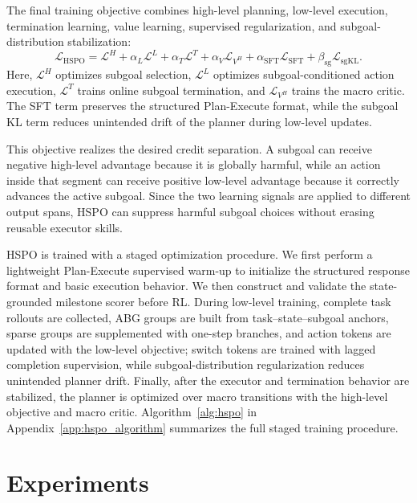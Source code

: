 \documentclass{article}
\newcommand{\wei}[1]{\textcolor{red}{#1}}
\begin{document}
The final training objective combines high-level planning, low-level execution, termination learning, value learning, supervised regularization, and subgoal-distribution stabilization:
\begin{equation}
\mathcal{L}_{\mathrm{HSPO}}
=
\mathcal{L}^{H}
+
\alpha_L \mathcal{L}^{L}
+
\alpha_T \mathcal{L}^{T}
+
\alpha_V \mathcal{L}_{V^H}
+
\alpha_{\mathrm{SFT}}\mathcal{L}_{\mathrm{SFT}}
+
\beta_{\mathrm{sg}}\mathcal{L}_{\mathrm{sgKL}}.
\label{eq:total_loss}
\end{equation}
Here, $\mathcal{L}^{H}$ optimizes subgoal selection, $\mathcal{L}^{L}$ optimizes subgoal-conditioned action execution, $\mathcal{L}^{T}$ trains online subgoal termination, and $\mathcal{L}_{V^H}$ trains the macro critic. The SFT term preserves the structured Plan-Execute format, while the subgoal KL term reduces unintended drift of the planner during low-level updates.

This objective realizes the desired credit separation. A subgoal can receive negative high-level advantage because it is globally harmful, while an action inside that segment can receive positive low-level advantage because it correctly advances the active subgoal. Since the two learning signals are applied to different output spans, HSPO can suppress harmful subgoal choices without erasing reusable executor skills.

HSPO is trained with a staged optimization procedure. We first perform a lightweight Plan-Execute supervised warm-up to initialize the structured response format and basic execution behavior. We then construct and validate the state-grounded milestone scorer before RL. During low-level training, complete task rollouts are collected, ABG groups are built from task--state--subgoal anchors, sparse groups are supplemented with one-step branches, and action tokens are updated with the low-level objective; switch tokens are trained with lagged completion supervision, while subgoal-distribution regularization reduces unintended planner drift. Finally, after the executor and termination behavior are stabilized, the planner is optimized over macro transitions with the high-level objective and macro critic. Algorithm~\ref{alg:hspo} in Appendix~\ref{app:hspo_algorithm} summarizes the full staged training procedure.


\section{Experiments}
\label{sec:experiments}
\end{document}
